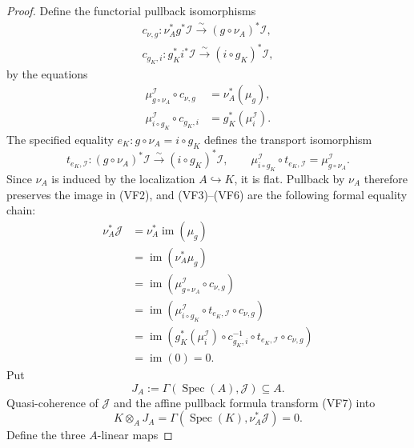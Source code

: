 \begin{proof}
  Define the functorial pullback isomorphisms
  \[
  \begin{gathered}
    c_{\nu,g}\colon
      \nu_A^*g^*\mathcal I\xrightarrow{\sim}
        (g\circ\nu_A)^*\mathcal I,\\
    c_{g_K,i}\colon
      g_K^*i^*\mathcal I\xrightarrow{\sim}
        (i\circ g_K)^*\mathcal I,
  \end{gathered}                                                   \tag{VF4}
  \]
  by the equations
  \[
  \begin{aligned}
    \mu_{g\circ\nu_A}^{\mathcal I}\circ c_{\nu,g}
      &=\nu_A^*(\mu_g),\\
    \mu_{i\circ g_K}^{\mathcal I}\circ c_{g_K,i}
      &=g_K^*(\mu_i^{\mathcal I}).
  \end{aligned}                                                    \tag{VF5}
  \]
  The specified equality
  $e_K\colon g\circ\nu_A=i\circ g_K$ defines the transport isomorphism
  \[
    t_{e_K,\mathcal I}\colon
      (g\circ\nu_A)^*\mathcal I\xrightarrow{\sim}
        (i\circ g_K)^*\mathcal I,
    \qquad
    \mu_{i\circ g_K}^{\mathcal I}\circ t_{e_K,\mathcal I}
      =\mu_{g\circ\nu_A}^{\mathcal I}.                          \tag{VF6}
  \]
  Since $\nu_A$ is induced by the localization $A\hookrightarrow K$, it is
  flat.  Pullback by $\nu_A$ therefore preserves the image in (VF2), and
  (VF3)--(VF6) are the following formal equality chain:
  \[
  \begin{aligned}
    \nu_A^*\mathcal J
      &=\nu_A^*\operatorname{im}(\mu_g)\\
      &=\operatorname{im}(\nu_A^*\mu_g)\\
      &=\operatorname{im}
        (\mu_{g\circ\nu_A}^{\mathcal I}\circ c_{\nu,g})\\
      &=\operatorname{im}
        (\mu_{i\circ g_K}^{\mathcal I}\circ
          t_{e_K,\mathcal I}\circ c_{\nu,g})\\
      &=\operatorname{im}
        (g_K^*(\mu_i^{\mathcal I})\circ c_{g_K,i}^{-1}\circ
          t_{e_K,\mathcal I}\circ c_{\nu,g})\\
      &=\operatorname{im}(0)=0.
  \end{aligned}                                                    \tag{VF7}
  \]
  Put
  \[
    J_A:=\Gamma(\operatorname{Spec}(A),\mathcal J)\subseteq A.
  \]
  Quasi-coherence of $\mathcal J$ and the affine pullback formula transform
  (VF7) into
  \[
    K\otimes_AJ_A
      =\Gamma(\operatorname{Spec}(K),\nu_A^*\mathcal J)=0.        \tag{VF8}
  \]
  Define the three $A$-linear maps

\end{proof}
